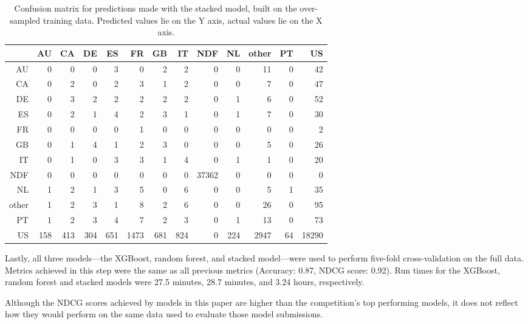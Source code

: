 \documentclass{article}
\begin{document}
\begin{table}[ht]
\centering
\begin{tabular}{r | rrrrrrrrrrrr}
 & AU & CA & DE & ES & FR & GB & IT & NDF & NL & other & PT & US \\ 
  \hline
  AU &   0 &   0 &   0 &   3 &   0 &   2 &   2 &   0 &   0 &  11 &   0 &  42 \\ 
  CA &   0 &   2 &   0 &   2 &   3 &   1 &   2 &   0 &   0 &   7 &   0 &  47 \\ 
  DE &   0 &   3 &   2 &   2 &   2 &   2 &   2 &   0 &   1 &   6 &   0 &  52 \\ 
  ES &   0 &   2 &   1 &   4 &   2 &   3 &   1 &   0 &   1 &   7 &   0 &  30 \\ 
  FR &   0 &   0 &   0 &   0 &   1 &   0 &   0 &   0 &   0 &   0 &   0 &   2 \\ 
  GB &   0 &   1 &   4 &   1 &   2 &   3 &   0 &   0 &   0 &   5 &   0 &  26 \\ 
  IT &   0 &   1 &   0 &   3 &   3 &   1 &   4 &   0 &   1 &   1 &   0 &  20 \\ 
  NDF &   0 &   0 &   0 &   0 &   0 &   0 &   0 & 37362 &   0 &   0 &   0 &   0 \\ 
  NL &   1 &   2 &   1 &   3 &   5 &   0 &   6 &   0 &   0 &   5 &   1 &  35 \\ 
  other &   1 &   2 &   3 &   1 &   8 &   2 &   6 &   0 &   0 &  26 &   0 &  95 \\ 
  PT &   1 &   2 &   3 &   4 &   7 &   2 &   3 &   0 &   1 &  13 &   0 &  73 \\ 
  US & 158 & 413 & 304 & 651 & 1473 & 681 & 824 &   0 & 224 & 2947 &  64 & 18290 \\
\end{tabular}
\caption{Confusion matrix for predictions made with the stacked model, built on the over-sampled training data. Predicted values lie on the Y axis, actual values lie on the X axis.}
\label{cm:stacked}
\end{table}

Lastly, all three models---the XGBoost, random forest, and stacked model---were used to perform five-fold cross-validation on the full data. Metrics achieved in this step were the same as all previous metrics (Accuracy: 0.87, NDCG score: 0.92). Run times for the XGBoost, random forest and stacked models were 27.5 minutes, 28.7 minutes, and 3.24 hours, respectively.

Although the NDCG scores achieved by models in this paper are higher than the competition's top performing models, it does not reflect how they would perform on the same data used to evaluate those model submissions. 
\end{document}

